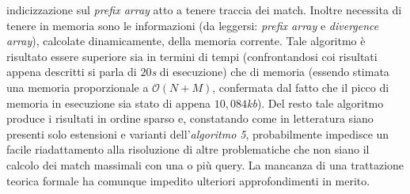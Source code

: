 \documentclass[a4paper,11pt, oneside]{article}
\begin{document}
indicizzazione sul \textit{prefix array} atto a tenere traccia dei
match. Inoltre necessita di tenere in memoria sono le informazioni (da leggersi:
\textit{prefix array} e \textit{divergence array}), calcolate
dinamicamente, della memoria corrente.
Tale algoritmo è risultato essere superiore sia in termini di tempi
(confrontandosi coi risultati appena descritti si parla di $20$\textit{s} di
esecuzione) che di memoria (essendo stimata una memoria proporzionale a
$\mathcal{O}(N+M)$, confermata dal fatto che il picco di memoria in esecuzione
sia stato di appena $10,084$\textit{kb}). Del resto tale algoritmo produce i
risultati in ordine sparso e, constatando come in letteratura siano presenti
solo estensioni e varianti dell'\textit{algoritmo 5}, probabilmente impedisce un
facile riadattamento alla risoluzione di altre problematiche che non siano il
calcolo dei match massimali con una o più query. La mancanza di una trattazione
teorica formale ha comunque impedito ulteriori approfondimenti in merito.
\end{document}
